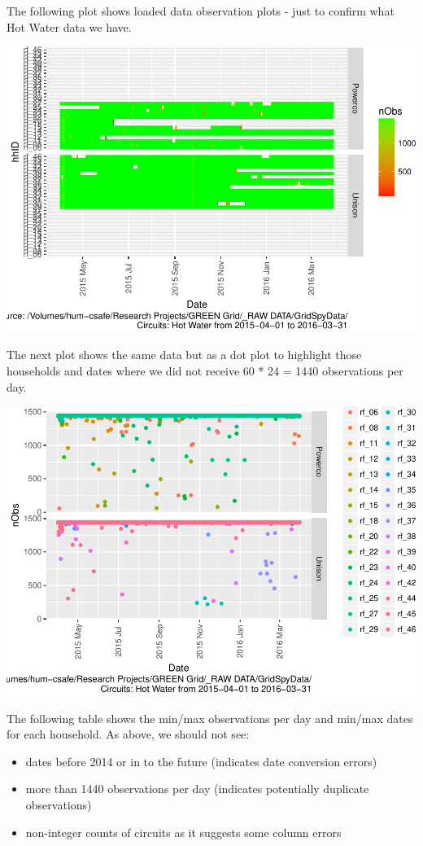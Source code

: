 \documentclass[]{article}
\providecommand{\tightlist}{%
  \setlength{\itemsep}{0pt}\setlength{\parskip}{0pt}}
\begin{document}
The following plot shows loaded data observation plots - just to confirm
what Hot Water data we have.

\includegraphics{nzGGHouseholdPowerDemandProfile_Hot Water_2015-04-01_2016-03-31_files/figure-latex/loadedFilesObs Tile Plot-1.pdf}

The next plot shows the same data but as a dot plot to highlight those
households and dates where we did not receive 60 * 24 = 1440
observations per day.

\includegraphics{nzGGHouseholdPowerDemandProfile_Hot Water_2015-04-01_2016-03-31_files/figure-latex/loadedFilesObs point plot-1.pdf}

The following table shows the min/max observations per day and min/max
dates for each household. As above, we should not see:

\begin{itemize}
\tightlist
\item
  dates before 2014 or in to the future (indicates date conversion
  errors)
\item
  more than 1440 observations per day (indicates potentially duplicate
  observations)
\item
  non-integer counts of circuits as it suggests some column errors
\end{itemize}
\end{document}
